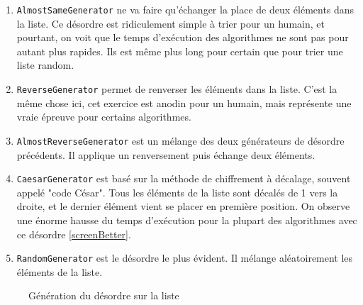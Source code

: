 \documentclass[a4paper,12pt]{article}
\begin{document}
\begin{enumerate}
    \item \texttt{AlmostSameGenerator} ne va faire qu'échanger la place de deux éléments dans la liste. Ce désordre est ridiculement simple à trier pour un humain, et pourtant, on voit que le temps d'exécution des algorithmes ne sont pas pour autant plus rapides. Ils est même plus long pour certain que pour trier une liste random.
    \item \texttt{ReverseGenerator} permet de renverser les éléments dans la liste. C'est la même chose ici, cet exercice est anodin pour un humain, mais représente une vraie épreuve pour certains algorithmes. 
    \item \texttt{AlmostReverseGenerator} est un mélange des deux générateurs de désordre précédents. Il applique un renversement puis échange deux éléments.
    \item \texttt{CaesarGenerator} est basé sur la méthode de chiffrement à décalage, souvent appelé "code César". Tous les éléments de la liste sont décalés de 1 vers la droite, et le dernier élément vient se placer en première position. On observe une énorme hausse du temps d'exécution pour la plupart des algorithmes avec ce désordre \ref{screenBetter}.
    \item \texttt{RandomGenerator} est le désordre le plus évident. Il mélange aléatoirement les éléments de la liste.
\end{enumerate}
\vspace{1.5cm}
\begin{figure}[h]
\vspace{1cm}
\caption{Génération du désordre sur la liste}
\end{figure}
\newpage
\end{document}
